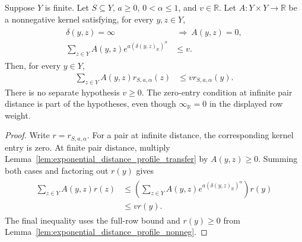 \begin{theorem}
    \label{thm:exponential_distance_profile_row}
    \leanok
    Suppose $Y$ is finite.  Let $S\subseteq Y$, $a\geq0$,
    $0<\alpha\leq1$, and $v\in\mathbb R$.
    Let $A:Y\times Y\to\mathbb R$ be a nonnegative kernel satisfying,
    for every $y,z\in Y$,
    \begin{align}
        \begin{aligned}
            \delta(y,z)=\infty                                       & \ \Longrightarrow\ A(y,z)=0, \\
            \sum_{z\in Y}A(y,z)e^{a(\delta(y,z)_{\mathbb R})^\alpha} & \leq v.
        \end{aligned}
        \label{eq:exponential_distance_profile_row_hypotheses}
    \end{align}
    Then, for every $y\in Y$,
    \begin{align}
        \sum_{z\in Y}A(y,z)r_{S,a,\alpha}(z) & \leq
        v r_{S,a,\alpha}(y).
        \label{eq:exponential_distance_profile_row}
    \end{align}
    There is no separate hypothesis $v\geq0$.  The zero-entry condition
    at infinite pair distance is part of the hypotheses, even though
    $\infty_{\mathbb R}=0$ in the displayed row weight.
\end{theorem}
\begin{proof}
    \leanok
    Write $r=r_{S,a,\alpha}$.  For a pair at infinite distance, the
    corresponding kernel entry is zero.  At finite pair distance,
    multiply Lemma~\ref{lem:exponential_distance_profile_transfer}
    by $A(y,z)\geq0$.
    Summing both cases and factoring out $r(y)$ gives
    \begin{align}
        \begin{aligned}
            \sum_{z\in Y}A(y,z)r(z)
             & \leq\left(\sum_{z\in Y}A(y,z)
            e^{a(\delta(y,z)_{\mathbb R})^\alpha}\right)r(y) \\
             & \leq v r(y).
        \end{aligned}
        \label{eq:exponential_distance_profile_row_proof}
    \end{align}
    The final inequality uses the full-row bound and
    $r(y)\geq0$ from Lemma~\ref{lem:exponential_distance_profile_nonneg}.
\end{proof}
